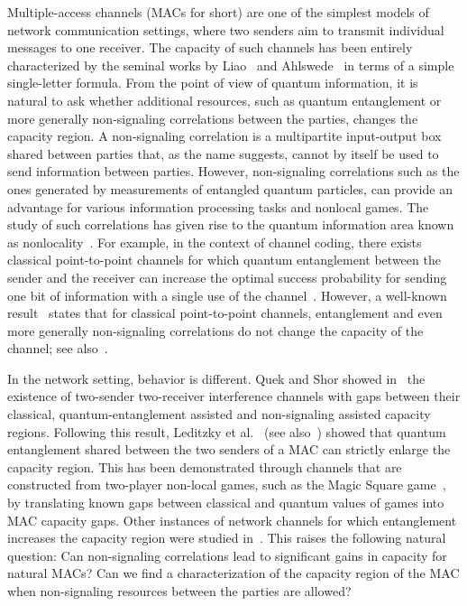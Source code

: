 Multiple-access channels (MACs for short) are one of the simplest models of network communication settings, where two senders aim to transmit individual messages to one receiver. The capacity of such channels has been entirely characterized by the seminal works by Liao~\cite{Liao73} and Ahlswede~\cite{Ahlswede73} in terms of a simple single-letter formula. From the point of view of quantum information, it is natural to ask whether additional resources, such as quantum entanglement or more generally non-signaling correlations between the parties, changes the capacity region. %
A non-signaling correlation is a multipartite input-output box shared between parties that, as the name suggests, cannot by itself be used to send information between parties. However, non-signaling correlations such as the ones generated by measurements of entangled quantum particles, can provide an advantage for various information processing tasks and nonlocal games. The study of such correlations has given rise to the quantum information area known as nonlocality~\cite{BCPSW14}. For example, in the context of channel coding, there exists classical point-to-point channels for which quantum entanglement between the sender and the receiver can increase the optimal success probability for sending one bit of information with a single use of the channel~\cite{PLMKR11,BF18}. However, a well-known result~\cite{BSST99} states that for classical point-to-point channels, entanglement and even more generally non-signaling correlations do not change the capacity of the channel; see also~\cite{Matthews12,BF18}.

In the network setting, behavior is different. Quek and Shor showed in~\cite{QS17} the existence of two-sender two-receiver interference channels with gaps between their classical, quantum-entanglement assisted and non-signaling assisted capacity regions. Following this result, Leditzky et al.~\cite{LALS20} (see also~\cite{SLSS22}) showed that quantum entanglement shared between the two senders of a MAC can strictly enlarge the capacity region. This has been demonstrated through channels that are constructed from two-player non-local games, such as the Magic Square game~\cite{Mermin90,Peres90,Aravind02,BBT05}, by translating known gaps between classical and quantum values of games into MAC capacity gaps. Other instances of network channels for which entanglement increases the capacity region were studied in~\cite{Noetzel20,ND20}. %
This raises the following natural question: Can non-signaling correlations lead to significant gains in capacity for natural MACs? Can we find a characterization of the capacity region of the MAC when non-signaling resources between the parties are allowed? 

